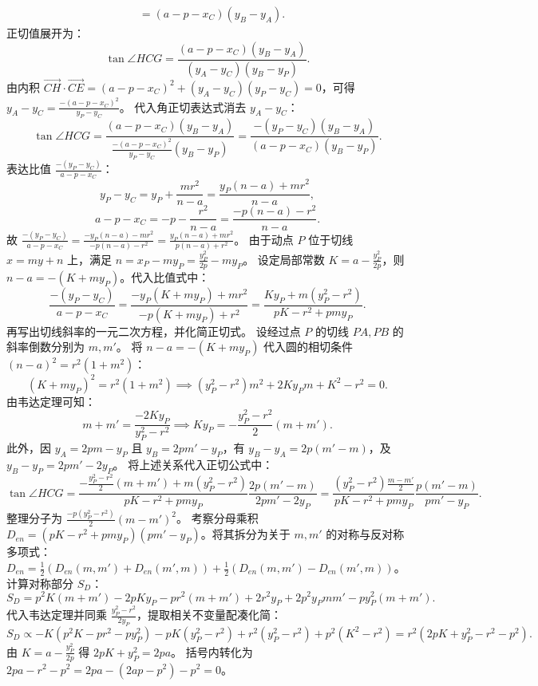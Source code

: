 \begin{solution}
\begin{align*}
&= (a - p - x_C)(y_B - y_A).
\end{align*}
正切值展开为：
\[ \tan\angle HCG = \frac{(a - p - x_C)(y_B - y_A)}{(y_A - y_C)(y_B - y_P)}. \]
由内积 $\overrightarrow{CH} \cdot \overrightarrow{CE} = (a - p - x_C)^2 + (y_A - y_C)(y_P - y_C) = 0$，可得 $y_A - y_C = \frac{-(a - p - x_C)^2}{y_P - y_C}$。
代入角正切表达式消去 $y_A - y_C$：
\[ \tan\angle HCG = \frac{(a - p - x_C)(y_B - y_A)}{ \frac{-(a - p - x_C)^2}{y_P - y_C} (y_B - y_P) } = \frac{-(y_P - y_C)(y_B - y_A)}{(a - p - x_C)(y_B - y_P)}. \]
表达比值 $\frac{-(y_P - y_C)}{a - p - x_C}$：
\[ y_P - y_C = y_P + \frac{m r^2}{n - a} = \frac{y_P(n - a) + m r^2}{n - a}, \]
\[ a - p - x_C = -p - \frac{r^2}{n - a} = \frac{-p(n - a) - r^2}{n - a}. \]
故 $\frac{-(y_P - y_C)}{a - p - x_C} = \frac{-y_P(n - a) - m r^2}{-p(n - a) - r^2} = \frac{y_P(n - a) + m r^2}{p(n - a) + r^2}$。
由于动点 $P$ 位于切线 $x = my + n$ 上，满足 $n = x_P - m y_P = \frac{y_P^2}{2p} - m y_P$。
设定局部常数 $K = a - \frac{y_P^2}{2p}$，则 $n - a = -(K + m y_P)$。代入比值式中：
\[ \frac{-(y_P - y_C)}{a - p - x_C} = \frac{-y_P(K + m y_P) + m r^2}{-p(K + m y_P) + r^2} = \frac{K y_P + m(y_P^2 - r^2)}{pK - r^2 + p m y_P}. \]
再写出切线斜率的一元二次方程，并化简正切式。
设经过点 $P$ 的切线 $PA, PB$ 的斜率倒数分别为 $m, m'$。
将 $n - a = -(K + m y_P)$ 代入圆的相切条件 $(n - a)^2 = r^2(1 + m^2)$：
\[ (K + m y_P)^2 = r^2(1 + m^2) \implies (y_P^2 - r^2)m^2 + 2K y_P m + K^2 - r^2 = 0. \]
由韦达定理可知：
\[ m + m' = \frac{-2K y_P}{y_P^2 - r^2} \implies K y_P = -\frac{y_P^2 - r^2}{2}(m + m'). \]
此外，因 $y_A = 2pm - y_P$ 且 $y_B = 2pm' - y_P$，有 $y_B - y_A = 2p(m' - m)$，及 $y_B - y_P = 2p m' - 2y_P$。
将上述关系代入正切公式中：
\[ \tan\angle HCG = \frac{-\frac{y_P^2 - r^2}{2}(m + m') + m(y_P^2 - r^2)}{pK - r^2 + p m y_P} \frac{2p(m' - m)}{2p m' - 2y_P} = \frac{(y_P^2 - r^2)\frac{m - m'}{2}}{pK - r^2 + p m y_P} \frac{p(m' - m)}{p m' - y_P}. \]
整理分子为 $\frac{-p(y_P^2 - r^2)}{2}(m - m')^2$。
考察分母乘积 $D_{en} = (pK - r^2 + p m y_P)(p m' - y_P)$。将其拆分为关于 $m, m'$ 的对称与反对称多项式：
$D_{en} = \frac{1}{2} (D_{en}(m, m') + D_{en}(m', m)) + \frac{1}{2} (D_{en}(m, m') - D_{en}(m', m))$。
计算对称部分 $S_D$：
\[ S_D = p^2 K(m + m') - 2p K y_P - p r^2(m + m') + 2r^2 y_P + 2p^2 y_P m m' - p y_P^2(m + m'). \]
代入韦达定理并同乘 $\frac{y_P^2 - r^2}{2y_P}$，提取相关不变量配凑化简：
\[ S_D \propto -K(p^2 K - p r^2 - p y_P^2) - pK(y_P^2 - r^2) + r^2(y_P^2 - r^2) + p^2(K^2 - r^2) = r^2(2pK + y_P^2 - r^2 - p^2). \]
由 $K = a - \frac{y_P^2}{2p}$ 得 $2pK + y_P^2 = 2pa$。
括号内转化为 $2pa - r^2 - p^2 = 2pa - (2ap - p^2) - p^2 = 0$。

\end{solution}
